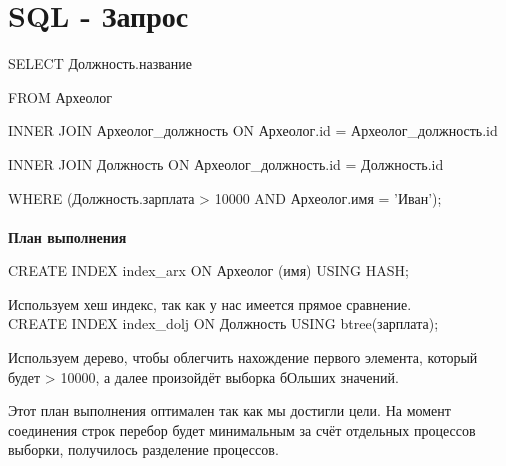 \documentclass{article}
\begin{document}
\section{SQL - Запрос}

SELECT Должность.название

FROM Археолог

INNER JOIN Археолог\_должность ON Археолог.id = Археолог\_должность.id

INNER JOIN Должность ON Археолог\_должность.id = Должность.id

WHERE (Должность.зарплата > 10000 AND Археолог.имя = 'Иван');
\\
\\
\textbf{План выполнения}

CREATE INDEX index\_arx ON Археолог (имя) USING HASH;

Используем хеш индекс, так как у нас имеется прямое сравнение.
\\


CREATE INDEX index\_dolj ON Должность USING btree(зарплата);

Используем дерево, чтобы облегчить нахождение первого элемента, который будет > 10000, а далее произойдёт выборка бОльших значений.

\begin{center}
\end{center}


Этот план выполнения оптимален так как мы достигли цели. На момент соединения строк перебор будет минимальным за счёт отдельных процессов выборки, получилось разделение процессов.
\end{document}
